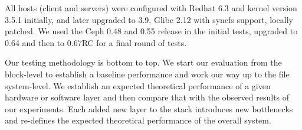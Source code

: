 All hosts  (client and servers) were configured
with Redhat 6.3 and kernel version 3.5.1 initially, and later upgraded to 3.9,
Glibc 2.12 with syncfs support, locally patched.  We used the Ceph 0.48 and
0.55 release in the initial tests, upgraded to 0.64 and then to 0.67RC for a
final round of tests.

Our testing methodology is bottom to top. We start our evaluation from the
block-level to establish a baseline performance and work
our way up to the file system-level. We establish an expected
theoretical performance of a given hardware or software layer and then compare
that with the observed results of our experiments. Each added new layer to the
stack introduces new bottlenecks and re-defines the expected theoretical
performance of the overall system. 

